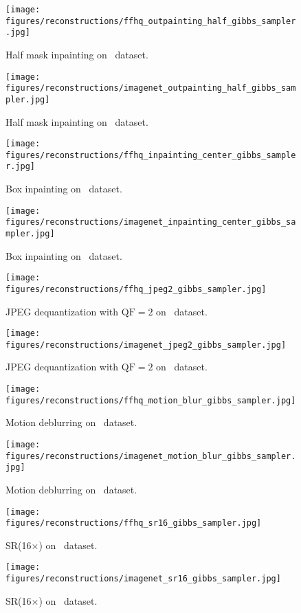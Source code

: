 \begin{figure}
    \centering
    \texttt{[image: figures/reconstructions/ffhq\_outpainting\_half\_gibbs\_sampler.jpg]}
    \caption{Half mask inpainting on \ffhq\ dataset.}
\end{figure}
\begin{figure}
    \centering
    \texttt{[image: figures/reconstructions/imagenet\_outpainting\_half\_gibbs\_sampler.jpg]}
    \caption{Half mask inpainting on \imagenet\ dataset.}
\end{figure}
\begin{figure}
    \centering
    \texttt{[image: figures/reconstructions/ffhq\_inpainting\_center\_gibbs\_sampler.jpg]}
    \caption{Box inpainting on \ffhq\ dataset.}
\end{figure}
\begin{figure}
    \centering
    \texttt{[image: figures/reconstructions/imagenet\_inpainting\_center\_gibbs\_sampler.jpg]}
    \caption{Box inpainting on \imagenet\ dataset.}
\end{figure}
\begin{figure}
    \centering
    \texttt{[image: figures/reconstructions/ffhq\_jpeg2\_gibbs\_sampler.jpg]}
    \caption{JPEG dequantization with $\mathrm{QF}=2$ on \ffhq\ dataset.}
\end{figure}
\begin{figure}
    \centering
    \texttt{[image: figures/reconstructions/imagenet\_jpeg2\_gibbs\_sampler.jpg]}
    \caption{JPEG dequantization with $\mathrm{QF}=2$ on \imagenet\ dataset.}
\end{figure}
\begin{figure}
    \centering
    \texttt{[image: figures/reconstructions/ffhq\_motion\_blur\_gibbs\_sampler.jpg]}
    \caption{Motion deblurring on \ffhq\ dataset.}
\end{figure}
\begin{figure}
    \centering
    \texttt{[image: figures/reconstructions/imagenet\_motion\_blur\_gibbs\_sampler.jpg]}
    \caption{Motion deblurring on \imagenet\ dataset.}
\end{figure}
\begin{figure}
    \centering
    \texttt{[image: figures/reconstructions/ffhq\_sr16\_gibbs\_sampler.jpg]}
    \caption{SR(16$\times$) on \ffhq\ dataset.}
\end{figure}
\begin{figure}
    \centering
    \texttt{[image: figures/reconstructions/imagenet\_sr16\_gibbs\_sampler.jpg]}
    \caption{SR(16$\times$) on \imagenet\ dataset.}
\end{figure}
